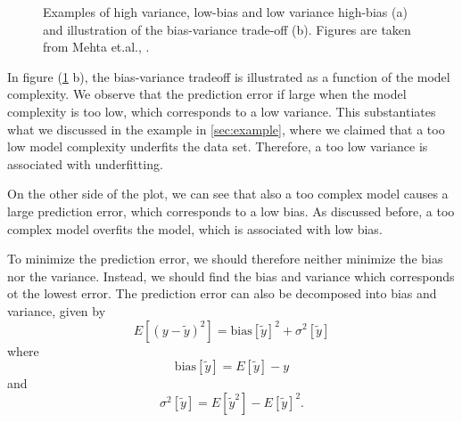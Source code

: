 \begin{figure}
	\centering
	\caption{Examples of high variance, low-bias and low variance high-bias (a) and illustration of the bias-variance trade-off (b). Figures are taken from Mehta et.al., \cite{mehta_high-bias_2019}.}%
	\label{fig:bias_variance}
\end{figure}

In figure (\ref{fig:bias_variance} b), the bias-variance tradeoff is illustrated as a function of the model complexity. We observe that the prediction error if large when the model complexity is too low, which corresponds to a low variance. This substantiates what we discussed in the example in \eqref{sec:example}, where we claimed that a too low model complexity underfits the data set. Therefore, a too low variance is associated with underfitting.

On the other side of the plot, we can see that also a too complex model causes a large prediction error, which corresponds to a low bias. As discussed before, a too complex model overfits the model, which is associated with low bias. 

To minimize the prediction error, we should therefore neither minimize the bias nor the variance. Instead, we should find the bias and variance which corresponds ot the lowest error. The prediction error can also be decomposed into bias and variance, given by
\begin{equation}
E[(y-\tilde{y})^2]=\text{bias}[\tilde{y}]^2+\sigma^2[\tilde{y}]
\end{equation}
where 
\begin{equation}
\text{bias}[\tilde{y}]=E[\tilde{y}]-y
\end{equation}
and 
\begin{equation}
\sigma^2[\tilde{y}]=E[\tilde{y}^2]-E[\tilde{y}]^2.
\end{equation}

